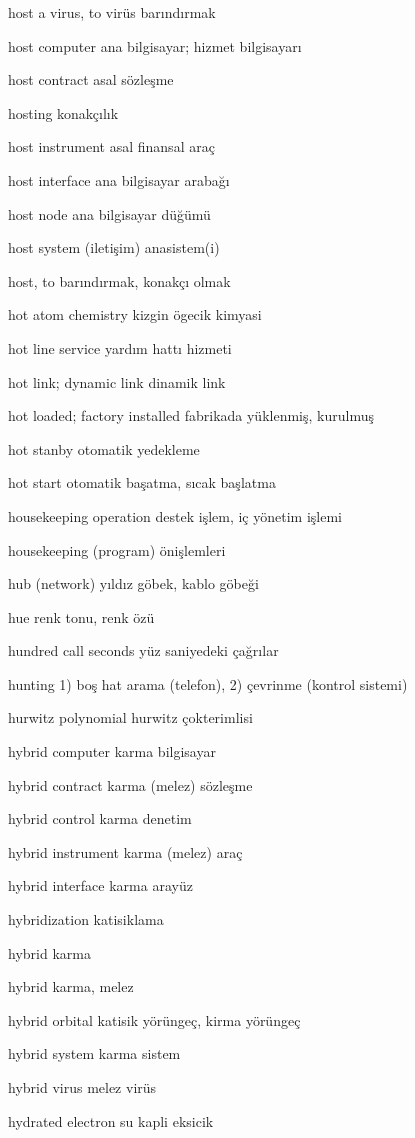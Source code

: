 \documentclass[12pt,fleqn]{article}\usepackage{../../common}
\begin{document}
host a virus, to virüs barındırmak

host computer ana bilgisayar; hizmet bilgisayarı

host contract asal sözleşme

hosting konakçılık

host instrument asal finansal araç

host interface ana bilgisayar arabağı

host node ana bilgisayar düğümü

host system (iletişim) anasistem(i)

host, to barındırmak, konakçı olmak

hot atom chemistry kizgin ögecik kimyasi

hot line service yardım hattı hizmeti

hot link; dynamic link dinamik link

hot loaded; factory installed fabrikada yüklenmiş, kurulmuş

hot stanby otomatik yedekleme

hot start otomatik başatma, sıcak başlatma

housekeeping operation destek işlem, iç yönetim işlemi

housekeeping (program) önişlemleri

hub (network) yıldız göbek, kablo göbeği

hue renk tonu, renk özü

hundred call seconds yüz saniyedeki çağrılar

hunting 1) boş hat arama (telefon), 2) çevrinme (kontrol sistemi)

hurwitz polynomial hurwitz çokterimlisi

hybrid computer karma bilgisayar

hybrid contract karma (melez) sözleşme

hybrid control karma denetim

hybrid instrument karma (melez) araç

hybrid interface karma arayüz

hybridization katisiklama

hybrid karma

hybrid karma, melez

hybrid orbital katisik yörüngeç, kirma yörüngeç

hybrid system karma sistem

hybrid virus melez virüs

hydrated electron su kapli eksicik
\end{document}
